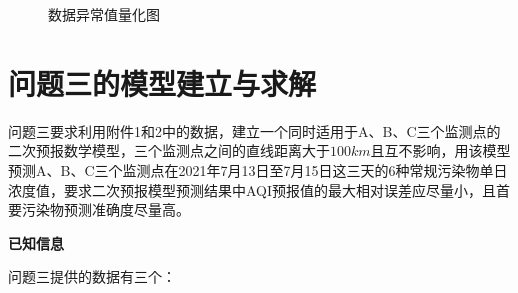 \documentclass[a4paper,10pt]{my_paper}
\numberwithin{equation}{section}
\begin{document}
\begin{figure}[htbp]
{    



  }
  \caption{数据异常值量化图}\label{fig_异常值}
\end{figure}



\section{问题三的模型建立与求解}
问题三要求利用附件1和2中的数据，建立一个同时适用于A、B、C三个监测点的二次预报数学模型，三个监测点之间的直线距离大于${100km}$且互不影响，用该模型预测A、B、C三个监测点在2021年7月13日至7月15日这三天的6种常规污染物单日浓度值，要求二次预报模型预测结果中AQI预报值的最大相对误差应尽量小，且首要污染物预测准确度尽量高。

\textbf{已知信息}

问题三提供的数据有三个：
\end{document}
